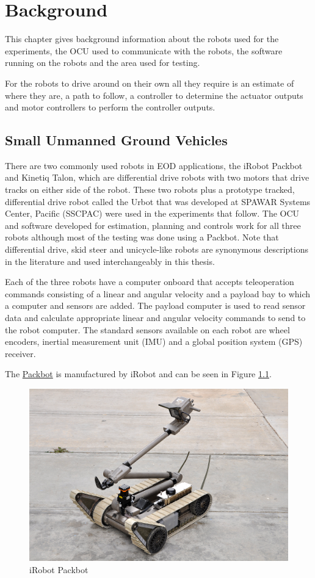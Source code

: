 \chapter{Background}
\label{ch:background}
This chapter gives background information about the robots used for the experiments, the OCU used to communicate with the robots, the software running on the robots and the area used for testing.

For the robots to drive around on their own all they require is an estimate of where they are, a path to follow, a controller to determine the actuator outputs and motor controllers to perform the controller outputs.

\section{Small Unmanned Ground Vehicles}
\label{sec:smallugvs}
There are two commonly used robots in EOD applications, the iRobot Packbot and Kinetiq Talon, which are differential drive robots with two motors that drive tracks on either side of the robot. These two robots plus a prototype tracked, differential drive robot called the Urbot that was developed at SPAWAR Systems Center, Pacific (SSCPAC) were used in the experiments that follow. The OCU and software developed for estimation, planning and controls work for all three robots although most of the testing was done using a Packbot. Note that differential drive, skid steer and unicycle-like robots are synonymous descriptions in the literature and used interchangeably in this thesis.

Each of the three robots have a computer onboard that accepts teleoperation commands consisting of a linear and angular velocity and a payload bay to which a computer and sensors are added. The payload computer is used to read sensor data and calculate appropriate linear and angular velocity commands to send to the robot computer. The standard sensors available on each robot are wheel encoders, inertial measurement unit (IMU) and a global position system (GPS) receiver.

The \href{http://www.irobot.com/sp.cfm?pageid=171}{Packbot} is manufactured by iRobot and can be seen in Figure \ref{fig:packbot}.

\begin{figure}[ht!]
	\centering
	\includegraphics[width=.3\textwidth]{images/packbotRetrotraverse}
	\caption{iRobot Packbot}
	\label{fig:packbot}
\end{figure}

